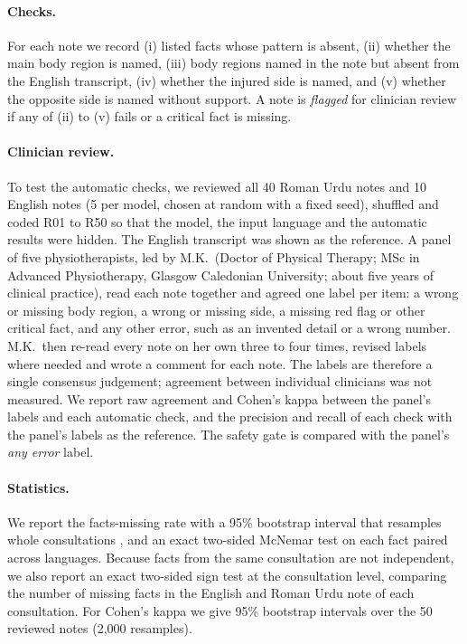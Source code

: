 \documentclass[11pt]{article}
\begin{document}
\paragraph{Checks.} For each note we record (i) listed facts whose pattern is absent, (ii) whether the main body region is named, (iii) body regions named in the note but absent from the English transcript, (iv) whether the injured side is named, and (v) whether the opposite side is named without support. A note is \emph{flagged} for clinician review if any of (ii) to (v) fails or a critical fact is missing.

\paragraph{Clinician review.} To test the automatic checks, we reviewed all 40 Roman Urdu notes and 10 English notes (5 per model, chosen at random with a fixed seed), shuffled and coded R01 to R50 so that the model, the input language and the automatic results were hidden. The English transcript was shown as the reference. A panel of five physiotherapists, led by M.K.\ (Doctor of Physical Therapy; MSc in Advanced Physiotherapy, Glasgow Caledonian University; about five years of clinical practice), read each note together and agreed one label per item: a wrong or missing body region, a wrong or missing side, a missing red flag or other critical fact, and any other error, such as an invented detail or a wrong number. M.K.\ then re-read every note on her own three to four times, revised labels where needed and wrote a comment for each note. The labels are therefore a single consensus judgement; agreement between individual clinicians was not measured. We report raw agreement and Cohen's kappa \citep{cohen1960kappa} between the panel's labels and each automatic check, and the precision and recall of each check with the panel's labels as the reference. The safety gate is compared with the panel's \emph{any error} label.

\paragraph{Statistics.} We report the facts-missing rate with a 95\% bootstrap interval that resamples whole consultations \citep{efron1979bootstrap}, and an exact two-sided McNemar test \citep{mcnemar1947} on each fact paired across languages. Because facts from the same consultation are not independent, we also report an exact two-sided sign test at the consultation level, comparing the number of missing facts in the English and Roman Urdu note of each consultation. For Cohen's kappa we give 95\% bootstrap intervals over the 50 reviewed notes (2,000 resamples).
\end{document}
